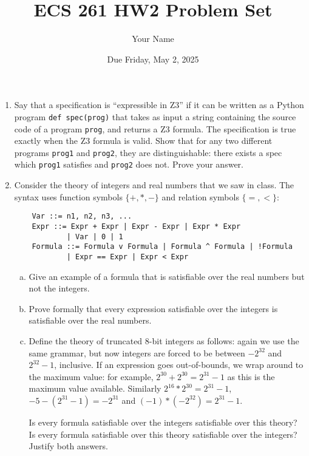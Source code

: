\documentclass{article}
\begin{document}
\title{ECS 261 HW2 Problem Set}
\author{Your Name}
\date{Due Friday, May 2, 2025}

\maketitle

\begin{enumerate}
\item
Say that a specification is ``expressible in Z3'' if it can be written as a Python program \texttt{def spec(prog)} that takes as input a string containing the source code of a program \texttt{prog}, and returns a Z3 formula.
The specification is true exactly when the Z3 formula is valid.
Show that for any two different programs \texttt{prog1} and \texttt{prog2},
they are distinguishable: there exists a spec which \texttt{prog1} satisfies and \texttt{prog2} does not.
Prove your answer.

\item
Consider the theory of integers and real numbers that we saw in class.
The syntax uses function symbols $\{+, *, -\}$ and relation symbols $\{=, <\}$:
\begin{verbatim}
    Var ::= n1, n2, n3, ...
    Expr ::= Expr + Expr | Expr - Expr | Expr * Expr
            | Var | 0 | 1
    Formula ::= Formula v Formula | Formula ^ Formula | !Formula
            | Expr == Expr | Expr < Expr
\end{verbatim}

\begin{enumerate}[(a)]
\item Give an example of a formula that is satisfiable over the real numbers but not the integers.
\item Prove formally that every expression satisfiable over the integers is satisfiable over the real numbers.
\item Define the theory of truncated 8-bit integers as follows: again we use the same grammar, but now integers are forced to be between $-2^{32}$ and $2^{32} - 1$, inclusive. If an expression goes out-of-bounds, we wrap around to the maximum value: for example, $2^{30} + 2^{30} = 2^{31} - 1$ as this is the maximum value available. Similarly $2^{16} * 2^{30} = 2^{31} - 1$, $-5 - (2^{31} - 1) = -2^{31}$ and $(-1) * (-2^{32}) = 2^{31} - 1$.

Is every formula satisfiable over the integers satisfiable over this theory?
Is every formula satisfiable over this theory satisfiable over the integers?
Justify both answers.
\end{enumerate}


\end{enumerate}
\end{document}
